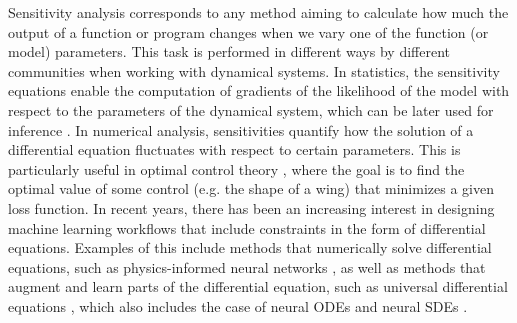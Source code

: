 Sensitivity analysis corresponds to any method aiming to calculate how much the output of a function or program changes when we vary one of the function (or model) parameters. 
This task is performed in different ways by different communities when working with dynamical systems. 
In statistics, the sensitivity equations enable the computation of gradients of the likelihood of the model with respect to the parameters of the dynamical system, which can be later used for inference \cite{ramsay2017dynamic}. 
In numerical analysis, sensitivities quantify how the solution of a differential equation fluctuates with respect to certain parameters. 
This is particularly useful in optimal control theory \cite{Giles_Pierce_2000}, where the goal is to find the optimal value of some control (e.g. the shape of a wing) that minimizes a given loss function. 
In recent years, there has been an increasing interest in designing machine learning workflows that include constraints in the form of differential equations. 
Examples of this include methods that numerically solve differential equations, such as physics-informed neural networks \cite{PINNs_2019}, as well as methods that augment and learn parts of the differential equation, such as universal differential equations \cite{rackauckas2020universal, Dandekar_2020}, which also includes the case of neural ODEs \cite{chen_neural_2019} and neural SDEs \cite{li2020scalable}.



